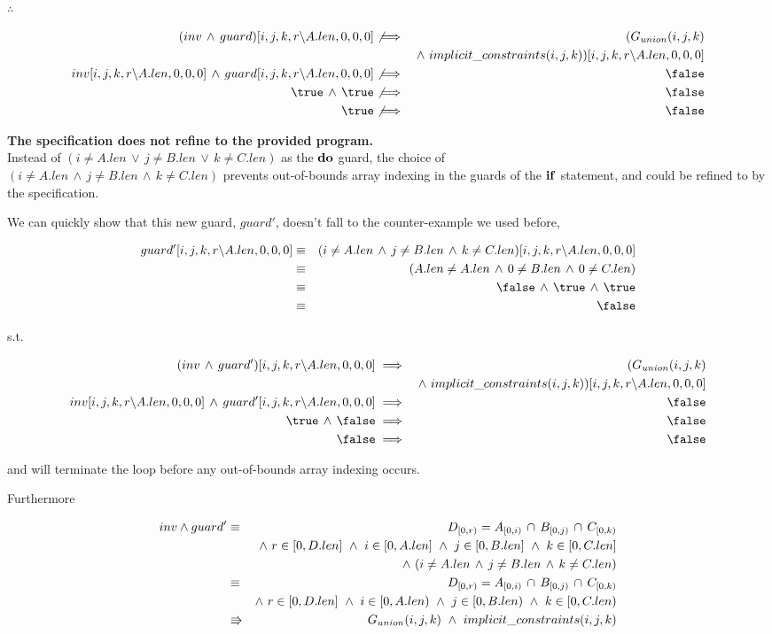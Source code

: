 \documentclass[a4paper]{article}
\newcommand{\DOGUARD}[3]{({#1} \neq A.len\, \lor\, {#2} \neq B.len\, \lor\, {#3} \neq C.len)}
\newcommand{\INTERSECTION}[4]{D_{[0, {#1})} = A_{[0, {#2})}\, \cap\, B_{[0, {#3})}\, \cap\, C_{[0, {#4})}}
\newcommand{\BOUNDED}[4]{{#1} \in [0, D.len] ~\land~ {#2} \in [0, A.len] ~\land~ {#3} \in [0, B.len] ~\land~ {#4} \in [0, C.len]}
\newcommand{\SUBSTITUTION}{[i, j, k, r \backslash A.len, 0, 0, 0]}
\begin{document}
$\therefore$

\begin{eqnarray*}
(inv\, \land\, guard)\SUBSTITUTION &\not\implies& (G_{union}(i, j, k)\\
&& \land~ implicit\_constraints(i, j, k))\SUBSTITUTION\\
inv\SUBSTITUTION\, \land\, guard\SUBSTITUTION &\not\implies& \false\\
\true\, \land\, \true &\not\implies& \false\\
\true &\not\implies& \false\\
\end{eqnarray*}

\textbf{The specification does not refine to the provided program.}\\

Instead of $\DOGUARD{i}{j}{k}$ as the ${\bf do}$ guard, the choice of\\ $(i \neq A.len\, \land\, j \neq B.len\, \land\, k \neq C.len)$ prevents out-of-bounds array indexing in the guards of the ${\bf if}$ statement, and could be refined to by the specification. 

We can quickly show that this new guard, $guard'$, doesn't fall to the counter-example we used before, 

\begin{eqnarray*}
guard'\SUBSTITUTION & \equiv & (i \neq A.len\, \land\, j \neq B.len\, \land\, k \neq C.len)\SUBSTITUTION\\
    & \equiv & (A.len \neq A.len\, \land\, 0 \neq B.len\, \land\, 0 \neq C.len)\\
    & \equiv & \false\, \land\, \true\, \land\, \true\\
    & \equiv & \false
\end{eqnarray*} 

s.t.

\begin{eqnarray*}
(inv\, \land\, guard')\SUBSTITUTION &\implies& (G_{union}(i, j, k)\\
&& \land~ implicit\_constraints(i, j, k))\SUBSTITUTION\\
inv\SUBSTITUTION\, \land\, guard'\SUBSTITUTION &\implies& \false\\
\true\, \land\, \false &\implies& \false\\
\false &\implies& \false
\end{eqnarray*}

and will terminate the loop before any out-of-bounds array indexing occurs.

Furthermore

\begin{eqnarray*}
inv \land guard' & \equiv & \INTERSECTION{r}{i}{j}{k}\\
        && \land~ \BOUNDED{r}{i}{j}{k}\\
        && \land~ (i \neq A.len\, \land\, j \neq B.len\, \land\, k \neq C.len)\\
& \equiv & \INTERSECTION{r}{i}{j}{k}\\
&& \land~ r \in [0, D.len] ~\land~ i \in [0, A.len) ~\land~ j \in [0, B.len) ~\land~ k \in [0, C.len)\\
& \entails & G_{union}(i, j, k) ~\land~ implicit\_constraints(i, j, k) 
\end{eqnarray*}
\end{document}
